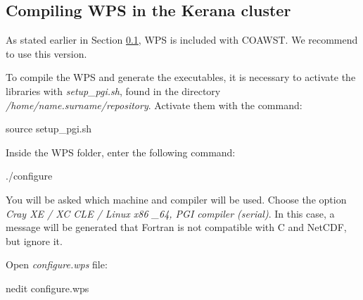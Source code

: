 \subsection{Compiling WPS in the Kerana cluster}\label{wpsker}
\bigskip

\begin{tcolorbox}[enhanced,
    grow to left by=0cm,%
    grow to right by=0cm,%
    enlarge top by=0cm,%
    enlarge bottom by=0cm,%
    tcbox raise base,
    boxrule=1.0pt,
    left=18mm,
    colframe=red!50!black,coltext=red!25!black,colback=red!10!white,
    overlay={\begin{tcbclipinterior}\fill[red!75!blue!50!white] (frame.south west)
      rectangle node[text=white,font=\sffamily\bfseries\footnotesize,rotate=0] {WARNING} ([xshift=18mm]frame.north west);\end{tcbclipinterior}}]
      As stated earlier in Section \textcolor{bleu_cite}{\ref{wpsker}}, WPS is included with COAWST. We recommend to use this version.
\end{tcolorbox}
\bigskip

\noindent To compile the WPS and generate the executables, it is necessary to activate the libraries with \textit{setup\_pgi.sh},
found in the directory \textit{/home/name.surname/repository}. Activate them with the command:
\bigskip

\begin{bashcode}
source setup_pgi.sh
\end{bashcode}
\bigskip

\noindent Inside the WPS folder, enter the following command:
\bigskip

\begin{bashcode}
./configure
\end{bashcode}
\bigskip

\noindent You will be asked which machine and compiler will be used. Choose the option 
\textit{Cray XE / XC CLE / Linux x86 \_64, PGI compiler (serial)}. In this case, a message will be generated that Fortran is not compatible 
with C and NetCDF, but ignore it.
\bigskip

\noindent Open \textit{configure.wps} file:
\bigskip

\begin{bashcode}
nedit configure.wps
\end{bashcode}
\bigskip

